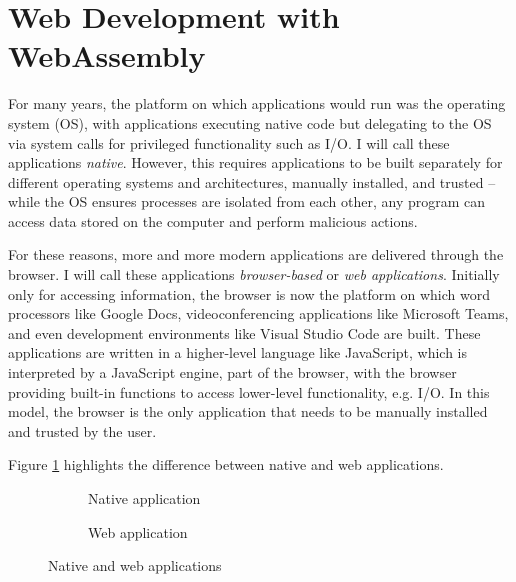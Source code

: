 \section{Web Development with WebAssembly}

\label{sec:webdev}

For many years, the platform on which applications would run was the operating system (OS), with applications executing native code but delegating to the OS via system calls for privileged functionality such as I/O. I will call these applications \emph{native}. However, this requires applications to be built separately for different operating systems and architectures, manually installed, and trusted -- while the OS ensures processes are isolated from each other, any program can access data stored on the computer and perform malicious actions.

For these reasons, more and more modern applications are delivered through the browser. I will call these applications \emph{browser-based} or \emph{web applications}. Initially only for accessing information, the browser is now the platform on which word processors like Google Docs, videoconferencing applications like Microsoft Teams, and even development environments like Visual Studio Code are built. These applications are written in a higher-level language like JavaScript, which is interpreted by a JavaScript engine, part of the browser, with the browser providing built-in functions to access lower-level functionality, e.g. I/O. In this model, the browser is the only application that needs to be manually installed and trusted by the user.

Figure \ref{fig:web-platform} highlights the difference between native and web applications.

\begin{figure}[H]
\centering
\begin{subfigure}{0.5\textwidth}
  \centering
\caption{Native application}
\end{subfigure}%
\begin{subfigure}{0.5\textwidth}
  \centering
\caption{Web application}
\end{subfigure}
\caption{Native and web applications}
\label{fig:web-platform}
\end{figure}

